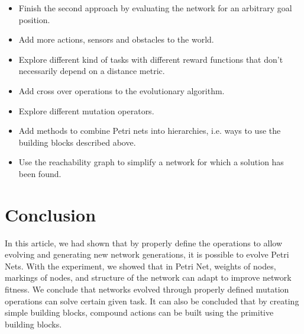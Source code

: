 \documentclass[12pt,a4paper,twocolumn]{article}
\begin{document}
\begin{itemize}
\item Finish the second approach by evaluating the network for an arbitrary goal position.
\item Add more actions, sensors and obstacles to the world.
\item Explore different kind of tasks with different reward functions that don't necessarily depend on a distance metric.
\item Add cross over operations to the evolutionary algorithm.
\item Explore different mutation operators.
\item Add methods to combine Petri nets into hierarchies, i.e. ways to use the building blocks described above.
\item Use the reachability graph to simplify a network for which a solution has been found.
\end{itemize}

\section{Conclusion}

In this article, we had shown that by properly define the operations to allow evolving and generating new network generations, it is possible to evolve Petri Nets. With the experiment, we showed that in Petri Net, weights of nodes, markings of nodes, and structure of the network can adapt to improve network fitness. We conclude that networks evolved through properly defined mutation operations can solve certain given task. It can also be concluded that by creating simple building blocks, compound actions can be built using the primitive building blocks. 



\end{document}
